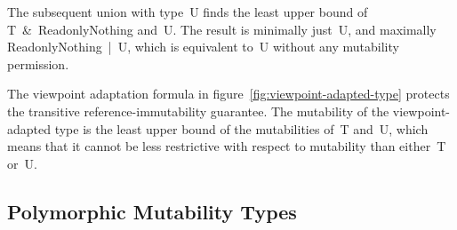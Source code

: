 The subsequent union with type~{\cd U} finds the least upper bound of \mbox{\cd T \& ReadonlyNothing} and~{\cd U}. The result is minimally just~{\cd U}, and maximally \mbox{\cd ReadonlyNothing | U}, which is equivalent to~{\cd U} without any mutability permission.

The viewpoint adaptation formula in figure~\ref{fig:viewpoint-adapted-type} protects the transitive reference-immutability guarantee.
The mutability of the viewpoint-adapted type is the least upper bound of the mutabilities of~{\cd T} and~{\cd U}, which means that it cannot be less restrictive with respect to mutability than either~{\cd T} or~{\cd U}.

\subsection{Polymorphic Mutability Types}




